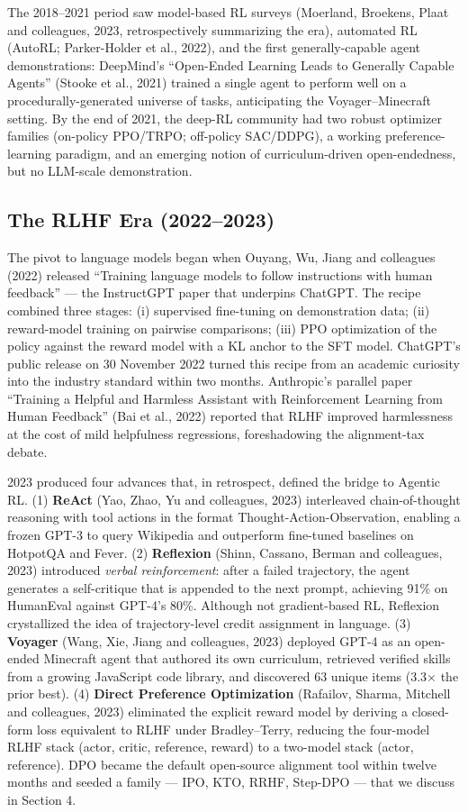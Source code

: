 The 2018--2021 period saw model-based RL surveys (Moerland, Broekens, Plaat and colleagues, 2023, retrospectively summarizing the era), automated RL (AutoRL; Parker-Holder et al., 2022), and the first generally-capable agent demonstrations: DeepMind's ``Open-Ended Learning Leads to Generally Capable Agents'' (Stooke et al., 2021) trained a single agent to perform well on a procedurally-generated universe of tasks, anticipating the Voyager--Minecraft setting. By the end of 2021, the deep-RL community had two robust optimizer families (on-policy PPO/TRPO; off-policy SAC/DDPG), a working preference-learning paradigm, and an emerging notion of curriculum-driven open-endedness, but no LLM-scale demonstration.

\subsection{The RLHF Era (2022--2023)}\label{the-rlhf-era-20222023}

The pivot to language models began when Ouyang, Wu, Jiang and colleagues (2022) released ``Training language models to follow instructions with human feedback'' --- the InstructGPT paper that underpins ChatGPT. The recipe combined three stages: (i) supervised fine-tuning on demonstration data; (ii) reward-model training on pairwise comparisons; (iii) PPO optimization of the policy against the reward model with a KL anchor to the SFT model. ChatGPT's public release on 30 November 2022 turned this recipe from an academic curiosity into the industry standard within two months. Anthropic's parallel paper ``Training a Helpful and Harmless Assistant with Reinforcement Learning from Human Feedback'' (Bai et al., 2022) reported that RLHF improved harmlessness at the cost of mild helpfulness regressions, foreshadowing the alignment-tax debate.

2023 produced four advances that, in retrospect, defined the bridge to Agentic RL. (1) \textbf{ReAct} (Yao, Zhao, Yu and colleagues, 2023) interleaved chain-of-thought reasoning with tool actions in the format Thought-Action-Observation, enabling a frozen GPT-3 to query Wikipedia and outperform fine-tuned baselines on HotpotQA and Fever. (2) \textbf{Reflexion} (Shinn, Cassano, Berman and colleagues, 2023) introduced \emph{verbal reinforcement}: after a failed trajectory, the agent generates a self-critique that is appended to the next prompt, achieving 91\% on HumanEval against GPT-4's 80\%. Although not gradient-based RL, Reflexion crystallized the idea of trajectory-level credit assignment in language. (3) \textbf{Voyager} (Wang, Xie, Jiang and colleagues, 2023) deployed GPT-4 as an open-ended Minecraft agent that authored its own curriculum, retrieved verified skills from a growing JavaScript code library, and discovered 63 unique items (3.3× the prior best). (4) \textbf{Direct Preference Optimization} (Rafailov, Sharma, Mitchell and colleagues, 2023) eliminated the explicit reward model by deriving a closed-form loss equivalent to RLHF under Bradley--Terry, reducing the four-model RLHF stack (actor, critic, reference, reward) to a two-model stack (actor, reference). DPO became the default open-source alignment tool within twelve months and seeded a family --- IPO, KTO, RRHF, Step-DPO --- that we discuss in Section 4.


